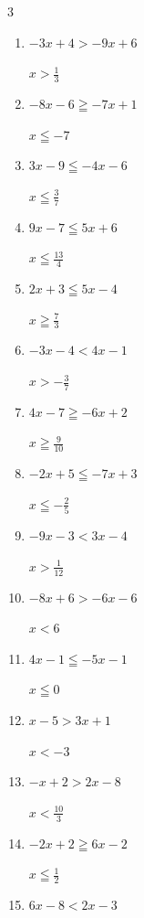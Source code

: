 \begin{multicols}{3}
\begin{enumerate}
  \item $-3x+4>-9x+6$

        $\displaystyle x>\frac{1}{3}$

  \item $-8x-6\geqq -7x+1$

        $\displaystyle x\leqq -7$

  \item $3x-9\leqq -4x-6$

        $\displaystyle x\leqq \frac{3}{7}$

  \item $9x-7\leqq 5x+6$

        $\displaystyle x\leqq \frac{13}{4}$

  \item $2x+3\leqq 5x-4$

        $\displaystyle x\geqq \frac{7}{3}$

  \item $-3x-4<4x-1$

        $\displaystyle x>-\frac{3}{7}$

  \item $4x-7\geqq -6x+2$

        $\displaystyle x\geqq \frac{9}{10}$

  \item $-2x+5\leqq -7x+3$

        $\displaystyle x\leqq -\frac{2}{5}$

  \item $-9x-3<3x-4$

        $\displaystyle x>\frac{1}{12}$

  \item $-8x+6>-6x-6$

        $\displaystyle x<6$

  \item $4x-1\leqq -5x-1$

        $\displaystyle x\leqq 0$

  \item $x-5>3x+1$

        $\displaystyle x<-3$

  \item $-x+2>2x-8$

        $\displaystyle x<\frac{10}{3}$

  \item $-2x+2\geqq 6x-2$

        $\displaystyle x\leqq \frac{1}{2}$

  \item $6x-8<2x-3$


\end{enumerate}
\end{multicols}
